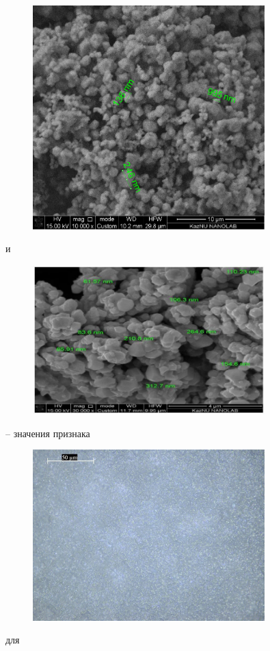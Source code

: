 \begin{figure}[H]
	\centering
	\includegraphics[width=0.8\textwidth]{assets/19}
	\caption*{}
\end{figure}и \begin{figure}[H]
	\centering
	\includegraphics[width=0.8\textwidth]{assets/20}
	\caption*{}
\end{figure}
-- значения признака \begin{figure}[H]
	\centering
	\includegraphics[width=0.8\textwidth]{assets/21}
	\caption*{}
\end{figure} для
